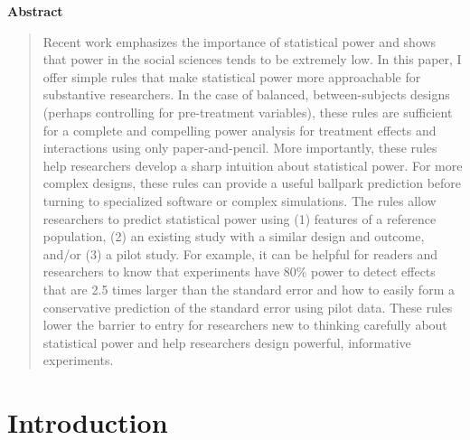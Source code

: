 \documentclass[12pt]{article}
\begin{document}
{\centerline{\textbf{Abstract}}}
\begin{quote}\noindent
Recent work emphasizes the importance of statistical power and shows that power in the social sciences tends to be extremely low. 
In this paper, I offer simple rules that make statistical power more approachable for substantive researchers. 
In the case of balanced, between-subjects designs (perhaps controlling for pre-treatment variables), these rules are sufficient for a complete and compelling power analysis for treatment effects and interactions using only paper-and-pencil. 
More importantly, these rules help researchers develop a sharp intuition about statistical power.
For more complex designs, these rules can provide a useful ballpark prediction before turning to specialized software or complex simulations. 
The rules allow researchers to predict statistical power using (1) features of a reference population, (2) an existing study with a similar design and outcome, and/or (3) a pilot study. 
For example, it can be helpful for readers and researchers to know that experiments have 80\% power to detect effects that are 2.5 times larger than the standard error and how to easily form a conservative prediction of the standard error using pilot data.
These rules lower the barrier to entry for researchers new to thinking carefully about statistical power and help researchers design powerful, informative experiments.
\end{quote}



\thispagestyle{empty}
\newpage

\doublespace

\setcounter{page}{1}


\section*{Introduction}
\end{document}

